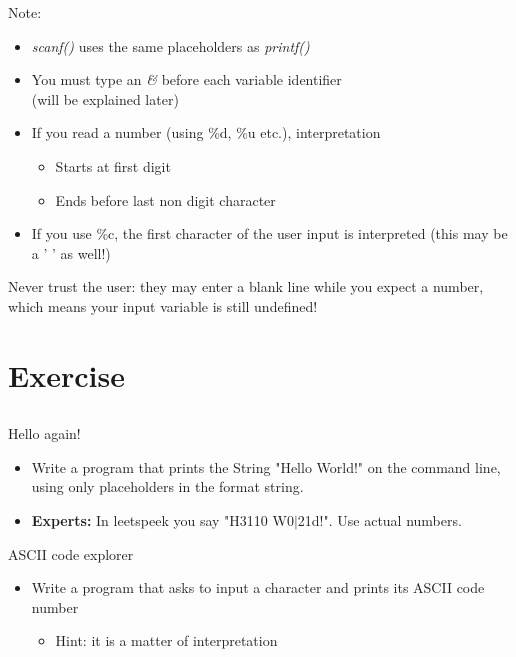\begin{frame}{Note:}
	\begin{itemize}
		\item \textit{scanf()} uses the same placeholders as \textit{printf()}
		\item You must type an \textit{\&} before each variable identifier \\
			(will be explained later)
		\item If you read a number (using \%d, \%u etc.), interpretation
		\begin{itemize}
			\item Starts at first digit
			\item Ends before last non digit character
		\end{itemize}
		\item If you use \%c, the first character of the user input is interpreted (this may be a ' ' as well!)
	\end{itemize}
	Never trust the user: they may enter a blank line while you expect a number, which means your input variable is still undefined!
		
\end{frame}
\section{Exercise}
\subsection{}

\begin{frame}[fragile]{Hello again!}
	\begin{itemize}
	
		\item Write a program that prints the String "Hello World!" on the command line, using only placeholders in the format string.
		\item \textbf{Experts:} In leetspeek you say "H3110 W0$|$21d!". Use actual numbers.

	\end{itemize}
\end{frame}
\begin{frame}[fragile]{ASCII code explorer}
	\begin{itemize}
		\item Write a program that asks to input a character and prints its ASCII code number
		\begin{itemize}
			\item<2-> Hint: it is a matter of interpretation
		\end{itemize}

	\end{itemize}	
\end{frame}

